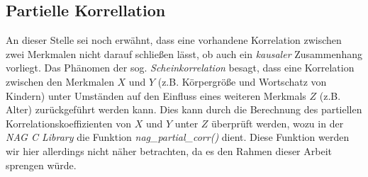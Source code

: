 \subsection{Partielle Korrellation}

An dieser Stelle sei noch erwähnt, dass eine vorhandene Korrelation zwischen zwei Merkmalen nicht darauf schließen lässt, ob auch ein {\it kausaler} Zusammenhang vorliegt. Das Phänomen der sog. {\it Scheinkorrelation} besagt, dass eine Korrelation zwischen den Merkmalen $X$ und $Y$ (z.B. Körpergröße und Wortschatz von Kindern) unter Umständen auf den Einfluss eines weiteren Merkmals $Z$ (z.B. Alter) zurückgeführt werden kann. Dies kann durch die Berechnung des partiellen Korrelationskoeffizienten von $X$ und $Y$ unter $Z$ überprüft werden, wozu in der {\it NAG C Library} die Funktion {\it nag\_partial\_corr()} dient. Diese Funktion werden wir hier allerdings nicht näher betrachten, da es den Rahmen dieser Arbeit sprengen würde.